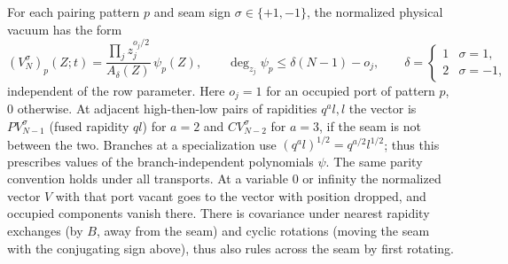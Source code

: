 \begin{proposition}\label{L:prop:vacuum-polynomials}
For each pairing pattern $p$ and seam sign $\sigma\in\{+1,-1\}$, the
normalized physical vacuum has the form
\[
 (V^\sigma_N)_p(Z;t)
    = \frac{\prod_j z_j^{o_j/2}}{A_\delta(Z)}\,\psi_{p}(Z),
 \qquad \deg_{z_j}\psi_p\le\delta(N-1)-o_j ,
 \qquad
 \delta=\begin{cases}1&\sigma=1,\\2&\sigma=-1,\end{cases}
\]
independent of the row parameter. Here \(o_j=1\) for an occupied port of pattern \(p\), 0 otherwise. At adjacent high-then-low pairs of rapidities \(q^a l,l\) the vector is \(P V^\sigma_{N-1}\) (fused rapidity \(q l\)) for \(a=2\) and \(C V^\sigma_{N-2}\) for \(a=3\), if the seam is not between the two. Branches at a specialization use \((q^a l)^{1/2}=q^{a/2}l^{1/2}\); thus this prescribes values of the branch-independent polynomials \(\psi\). The same parity convention holds under all transports. At a variable 0 or infinity the normalized vector \(V\) with that port vacant goes to the vector with position dropped, and occupied components vanish there. There is covariance under nearest rapidity exchanges (by \(B\), away from the seam) and cyclic rotations (moving the seam with the conjugating sign above), thus also rules across the seam by first rotating.

\end{proposition}
